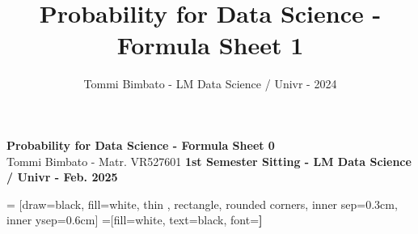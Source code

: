 \documentclass{article}
\title{Probability for Data Science - Formula Sheet 1}
\author{Tommi Bimbato - LM Data Science / Univr - 2024}
\date{}
\begin{document}
\begin{center}
{\huge{\textbf{Probability for Data Science - Formula Sheet 0}}}\\
\vspace{+0.2cm}
Tommi Bimbato - Matr. VR527601 \textbf{1st Semester Sitting - LM Data Science / Univr - Feb. 2025}\\
\vspace{+0.6cm}

\end{center}

\begin{multicols*}{3}
    \setlength{\abovedisplayskip}{1pt}
    \setlength{\belowdisplayskip}{1pt}
 = [draw=black, fill=white, thin ,
    rectangle, rounded corners, inner sep=0.3cm, inner ysep=0.6cm]
 =[fill=white, text=black, font=\small\bfseries]



\end{multicols*}
\end{document}
